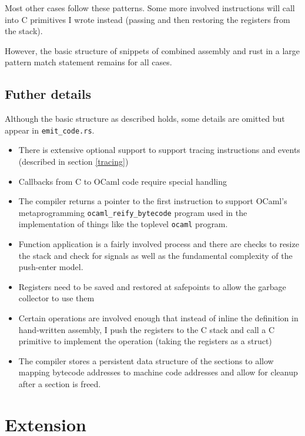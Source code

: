 Most other cases follow these patterns. Some more involved instructions will call into C primitives
I wrote instead (passing and then restoring the registers from the stack).

However, the basic structure of snippets of combined assembly and rust in a large pattern match
statement remains for all cases.

\subsection{Futher details}

Although the basic structure as described holds, some details are omitted but appear in
\texttt{emit\_code.rs}.

\begin{itemize}
      \item There is extensive optional support to support tracing instructions and events
            (described
            in section \ref{tracing})
      \item Callbacks from C to OCaml code require special handling
      \item The compiler returns a pointer to the first instruction to support OCaml's
            metaprogramming \texttt{ocaml\_reify\_bytecode} program used in the implementation of
            things like the
            toplevel \texttt{ocaml} program.
      \item Function application is a fairly involved process and there are checks to resize the
            stack and check for signals as well as the fundamental complexity of the push-enter
            model.
      \item Registers need to be saved and restored at safepoints to allow the garbage collector to
            use them
      \item Certain operations are involved enough that instead of inline the definition in
            hand-written assembly, I push the registers to the C stack and call a C primitive to
            implement the
            operation (taking the registers as a struct)
      \item The compiler stores a persistent data structure of the sections to allow mapping
            bytecode addresses to machine code addresses and allow for cleanup after a section is
            freed.
\end{itemize}

\section{Extension}

